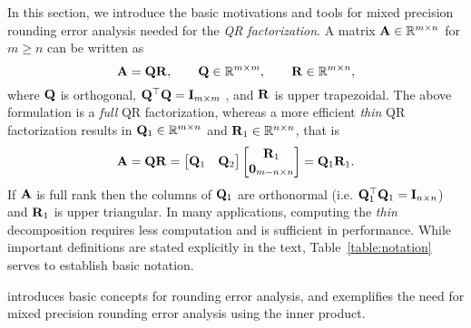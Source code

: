 In this section, we introduce the basic motivations and tools for mixed precision rounding error analysis needed for the {\it QR factorization}.
A matrix $\mathbf{A} \in \mathbb{R}^{m \times n}$ for $m\geq n$ can be written as
$$\mathbf{A} = \mathbf{QR},
\qquad
\mathbf{Q} \in \mathbb{R}^{m \times m},
\qquad
\mathbf{R} \in \mathbb{R}^{m \times n},$$
where $\mathbf{Q}$ is orthogonal, $\mathbf{Q}^\top \mathbf{Q} = \mathbf{I}_{m\times m}$ , and $\mathbf{R}$ is upper trapezoidal.
The above formulation is a \emph{full} QR factorization, whereas a more efficient \emph{thin} QR factorization results in $\mathbf{Q}_{1}\in\mathbb{R}^{m\times n}$ and $\mathbf{R}_{1}\in\mathbb{R}^{n\times n}$, that is
\[
\mathbf{A} = \mathbf{QR} = \begin{bmatrix}\mathbf{Q}_{1} & \mathbf{Q}_2\end{bmatrix} \begin{bmatrix}\mathbf{R}_{1} \\ \mathbf{0}_{m-n \times n}\end{bmatrix} = \mathbf{Q}_{1}\mathbf{R}_{1}.
\]
If $\mathbf{A}$ is full rank then the columns of $\mathbf{Q}_{1}$ are orthonormal (i.e. $\mathbf{Q}_{1}^{\top}\mathbf{Q}_{1}=\mathbf{I}_{n\times n}$) and $\mathbf{R}_1$ is upper triangular.
In many applications, computing the \emph{thin} decomposition requires less computation and is sufficient in performance. 
While important definitions are stated explicitly in the text, Table~\ref{table:notation} serves to establish basic notation.

 introduces basic concepts for rounding error analysis, and  exemplifies the need for mixed precision rounding error analysis using the inner product.
